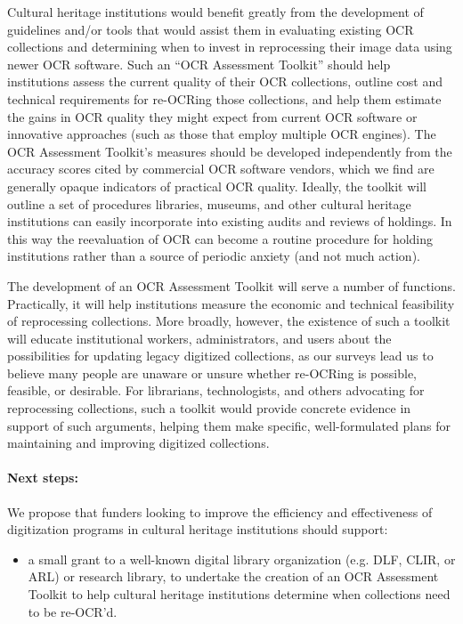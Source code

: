 \documentclass[twoside,11pt]{report}
\begin{document}
Cultural heritage institutions would benefit greatly from the development of guidelines and/or tools that would assist them in evaluating existing OCR collections and determining when to invest in reprocessing their image data using newer OCR software. Such an ``OCR Assessment Toolkit'' should help institutions assess the current quality of their OCR collections, outline cost and technical requirements for re-OCRing those collections, and help them estimate the gains in OCR quality they might expect from current OCR software or innovative approaches (such as those that employ multiple OCR engines). The OCR Assessment Toolkit's measures should be developed independently from the accuracy scores cited by commercial OCR software vendors, which we find are generally opaque indicators of practical OCR quality. Ideally, the toolkit will outline a set of procedures libraries, museums, and other cultural heritage institutions can easily incorporate into existing audits and reviews of holdings. In this way the reevaluation of OCR can become a routine procedure for holding institutions rather than a source of periodic anxiety (and not much action).

The development of an OCR Assessment Toolkit will serve a number of functions. Practically, it will help institutions measure the economic and technical feasibility of reprocessing collections. More broadly, however, the existence of such a toolkit will educate institutional workers, administrators, and users about the possibilities for updating legacy digitized collections, as our surveys lead us to believe many people are unaware or unsure whether re-OCRing is possible, feasible, or desirable. For librarians, technologists, and others advocating for reprocessing collections, such a toolkit would provide concrete evidence in support of such arguments, helping them make specific, well-formulated plans for maintaining and improving digitized collections.

\paragraph{Next steps:} We propose that funders looking to improve the efficiency and effectiveness of digitization programs in cultural heritage institutions should support:
\begin{itemize}

\item a small grant to a well-known digital library organization (e.g. DLF, CLIR, or ARL) or research library, to undertake the creation of an OCR Assessment Toolkit to help cultural heritage institutions determine when collections need to be re-OCR'd.

\end{itemize}
\end{document}
